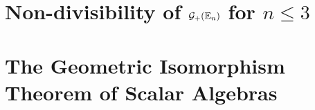 

\newpage

\section{Non-divisibility of $\mathcal{G}_+(\mathbb{E}_n)$ for $n \leq 3$}

\newpage

\section{The Geometric Isomorphism Theorem of Scalar Algebras}

